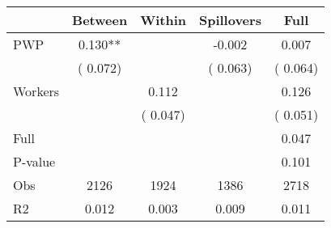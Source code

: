 
\begin{tabular}{l*{4}{c}}\hline&\multicolumn{1}{c}{Between}&\multicolumn{1}{c}{Within}&\multicolumn{1}{c}{Spillovers}&\multicolumn{1}{c}{Full}\\ \hline
 PWP           &              0.130**      &                                               &       -0.002 &         0.007                            \\ 
                               &        (       0.072)           &                                       &       (       0.063)     &      (       0.064)                                           \\ 
 Workers       &                                               &        0.112    &                                &             0.126                            \\ 
                               &                                               & (       0.047)                  &                                        &      (       0.051)                                           \\ 
\hline                                                                                                                                                                                                                                            
 Full                  &                                               &                                               &                                        &             0.047                                     \\ 
 P-value               &                                               &                                               &                                        &             0.101                                           \\ 
 Obs                   &               2126               &       1924                       &       1386                &              2718                                               \\ 
 R2                    &                      0.012              &              0.003                      &              0.009               &                     0.011                                              \\ 
\hline \end{tabular}                                                                                                                                                                                                              